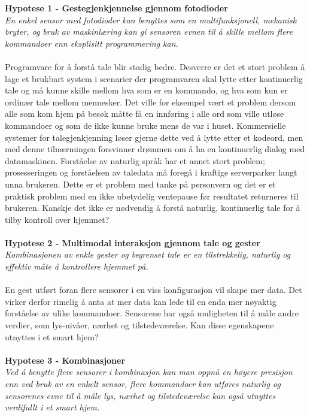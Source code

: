 \textbf{Hypotese 1 - Gestegjenkjennelse gjennom fotodioder}\\
\emph{En enkel sensor med fotodioder kan benyttes som en multifunksjonell, mekanisk bryter, og bruk av maskinlæring kan gi sensoren evnen til å skille mellom flere kommandoer enn eksplisitt programmering kan.}\\\\
Programvare for å forstå tale blir stadig bedre. Desverre er det et stort problem å lage et brukbart system i scenarier der programvaren skal lytte etter kontinuerlig tale og må kunne skille mellom hva som er en kommando, og hva som kun er ordinær tale mellom mennesker. Det ville for eksempel vært et problem dersom alle som kom hjem på besøk måtte få en innføring i alle ord som ville utløse kommandoer og som de ikke kunne bruke mens de var i huset. Kommersielle systemer for talegjenkjenning løser gjerne dette ved å lytte etter et kodeord, men med denne tilnærmingen forsvinner drømmen om å ha en kontinuerlig dialog med datamaskinen. Forståelse av naturlig språk har et annet stort problem; prosesseringen og forståelsen av taledata må foregå i kraftige serverparker langt unna brukeren. Dette er et problem med tanke på personvern og det er et praktisk problem med en ikke ubetydelig ventepause før resultatet returneres til brukeren. Kanskje det ikke er nødvendig å forstå naturlig, kontinuerlig tale for å tilby kontroll over hjemmet?\\\\
\textbf{Hypotese 2 - Multimodal interaksjon gjennom tale og gester}\\
\emph{Kombinasjonen av enkle gester og begrenset tale er en tilstrekkelig, naturlig og effektiv måte å kontrollere hjemmet på.}\\\\
En gest utført foran flere sensorer i en viss konfigurasjon vil skape mer data. Det virker derfor rimelig å anta at mer data kan lede til en enda mer nøyaktig forståelse av ulike kommandoer. Sensorene har også muligheten til å måle andre verdier, som lys-nivåer, nærhet og tilstedeværelse. Kan disse egenskapene utnyttes i et smart hjem?\\\\
\textbf{Hypotese 3 - Kombinasjoner}\\
\emph{Ved å benytte flere sensorer i kombinasjon kan man oppnå en høyere presisjon enn ved bruk av en enkelt sensor, flere kommandoer kan utføres naturlig og sensorenes evne til å måle lys, nærhet og tilstedeværelse kan også utnyttes verdifullt i et smart hjem.}\\\\
